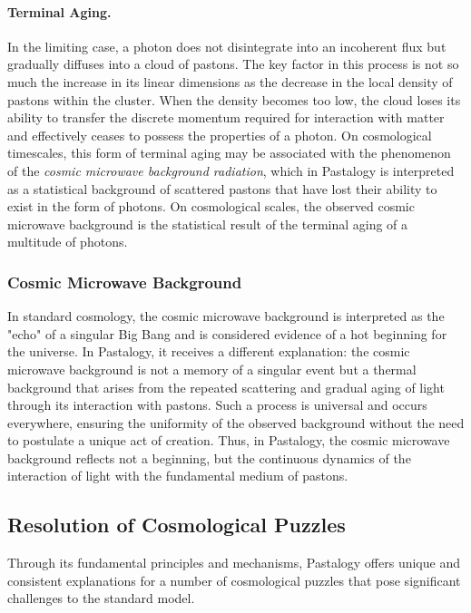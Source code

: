 \documentclass[pdflatex,sn-mathphys-num]{sn-jnl}
\begin{document}
\paragraph{Terminal Aging.}
In the limiting case, a photon does not disintegrate into an incoherent flux but gradually diffuses into a cloud of pastons. The key factor in this process is not so much the increase in its linear dimensions as the decrease in the local density of pastons within the cluster. When the density becomes too low, the cloud loses its ability to transfer the discrete momentum required for interaction with matter and effectively ceases to possess the properties of a photon. On cosmological timescales, this form of terminal aging may be associated with the phenomenon of the \emph{cosmic microwave background radiation}, which in Pastalogy is interpreted as a statistical background of scattered pastons that have lost their ability to exist in the form of photons. On cosmological scales, the observed cosmic microwave background is the statistical result of the terminal aging of a multitude of photons.

\subsubsection*{Cosmic Microwave Background}\label{subsubsec:relic-radiation}
In standard cosmology, the cosmic microwave background is interpreted as the "echo" of a singular Big Bang \cite{alpher1948-bigbang, penzias1965-cmb} and is considered evidence of a hot beginning for the universe.
In Pastalogy, it receives a different explanation: the cosmic microwave background is not a memory of a singular event but a thermal background that arises from the repeated scattering and gradual aging of light through its interaction with pastons.
Such a process is universal and occurs everywhere, ensuring the uniformity of the observed background without the need to postulate a unique act of creation.
Thus, in Pastalogy, the cosmic microwave background reflects not a beginning, but the continuous dynamics of the interaction of light with the fundamental medium of pastons.

\subsection{Resolution of Cosmological Puzzles}\label{subsec:cosmological-solutions}

Through its fundamental principles and mechanisms, Pastalogy offers unique and consistent explanations for a number of cosmological puzzles that pose significant challenges to the standard model.
\end{document}

